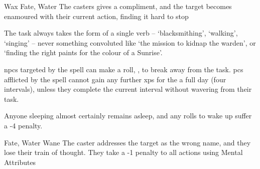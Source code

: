   {}%
  {Wax}%
  {Fate, Water}%
  {}%
  {The casters gives a compliment, and the target becomes enamoured with their current action, finding it hard to stop}%
  {
    The task always takes the form of a single verb -- `blacksmithing', `walking', `singing' -- never something convoluted like `the mission to kidnap the warden', or `finding the right paints for the colour of a Sunrise'.

    \Glspl{npc} targeted by the spell can make a  roll, \tn[8], to break away from the task.
    \Glspl{pc} afflicted by the spell cannot gain any further \glspl{xp} for the a full day (four \glspl{interval}), unless they complete the current \gls{interval} without wavering from their task.

  Anyone sleeping almost certainly remains asleep, and any rolls to wake up suffer a -4 penalty.}

  {Fate, Water}%
  {Wane}%
  {}%
  {}%
  {The caster addresses the target as the wrong name, and they lose their train of thought.
    They take a -1 penalty to all actions using Mental Attributes}%
  {}

